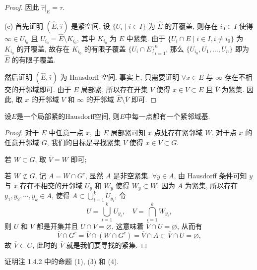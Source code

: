 \begin{proof}
因此 $\widehat{\tau}|_E=\tau$.

(c) 首先证明 $(\widehat{E},\widehat{\tau})$ 是紧空间. 设 $\{U_i\mid i\in I\}$
为 $\widehat{E}$ 的开覆盖, 则存在 $i_0\in I$ 使得 $\infty\in U_{i_0}$ 且 $U_{i_0}=\widehat{E}\setminus K_{i_0}$,
其中 $K_{i_0}$ 为 $E$ 中紧集. 由于 $\{U_i\cap E\mid i\in I,i\neq i_0\}$ 为 $K_{i_0}$
的开覆盖, 故存在 $K_{i_0}$ 的有限子覆盖 $\{U_i\cap E\}_{i=1}^n$, 那么
$\{U_{i_0},U_1,\dots,U_n\}$ 即为 $\widehat{E}$ 的有限子覆盖.

然后证明 $(\widehat{E},\widehat{\tau})$ 为 Hausdorff 空间. 事实上,
只需要证明 $\forall x\in E$ 与 $\infty$ 存在不相交的开邻域即可.
由于 $E$ 局部紧, 所以存在开集 $V$ 使得 $x\in V\subset E$ 且 $\overline{V}$ 为紧集.
因此, 取 $x$ 的开邻域 $V$ 和 $\infty$ 的开邻域 $\widehat{E}\setminus\overline{V}$
即可.
\end{proof}

\begin{exercise}
设$E$是一个局部紧的Hausdorff空间, 则$E$中每一点都有一个紧邻域基.
\end{exercise}

\begin{proof}
对于 $E$ 中任意一点 $x$, 由 $E$ 局部紧可知 $x$ 点处存在紧邻域 $W$.
对于点 $x$ 的任意开邻域 $G$, 我们的目标是寻找紧集 $\overline{V}$
使得 $x\in\overline{V}\subset G$.

若 $W\subset G$, 取 $\overline{V}=W$ 即可;

若 $W\not\subset G$, 记 $A=W\cap G^c$, 显然 $A$ 是非空紧集. $\forall y\in A$,
由 Hausdorff 条件可知 $y$ 与 $x$ 存在不相交的开邻域 $U_y$ 和 $W_y$ 使得 $W_y\subset W$.
因为 $A$ 为紧集, 所以存在
$y_1,y_2,\cdots,y_k\in A$, 使得 $A\subset\bigcup_{i=1}^k U_{y_i}$, 令
\[U=\bigcup_{i=1}^kU_{y_i},\quad V=\bigcap_{i=1}^kW_{y_i},\]
则 $U$ 和 $V$ 都是开集并且 $U\cap V=\varnothing$, 这意味着 $\overline{V}\cap U=\varnothing$, 从而有
\[\overline{V}\cap G^c=\overline{V}\cap\left(W\cap G^c\right)=\overline{V}\cap A\subset\overline{V}\cap U=\varnothing,\]
故 $\overline{V}\subset G$, 此时的 $\overline{V}$ 就是我们要寻找的紧集.
\end{proof}

\begin{exercise}
    证明注 1.4.2 中的命题 (1), (3) 和 (4).
\end{exercise}

